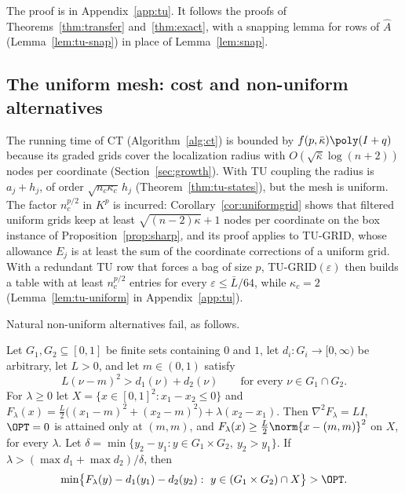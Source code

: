 The proof is in Appendix~\ref{app:tu}. It follows the proofs of
Theorems~\ref{thm:transfer} and~\ref{thm:exact}, with a snapping lemma for
rows of $\hat A$ (Lemma~\ref{lem:tu-snap}) in place of
Lemma~\ref{lem:snap}.

\subsection{The uniform mesh: cost and non-uniform alternatives}\label{sec:tu-limits}

The running time of CT (Algorithm~\ref{alg:ct}) is bounded by
$f(p,\bar\kappa)\poly(I+q)$ because its graded grids cover the localization
radius with $O(\sqrt{\bar\kappa}\log(n+2))$ nodes per coordinate
(Section~\ref{sec:growth}). With TU coupling the radius is
$a_j+h_j$, of order $\sqrt{n_c\kappa_c}\,h_j$ (Theorem~\ref{thm:tu-states}),
but the mesh is uniform. The factor $n_c^{p/2}$ in $K^p$ is incurred:
Corollary~\ref{cor:uniformgrid} shows that filtered uniform grids keep at
least $\sqrt{(n-2)\kappa}+1$ nodes per coordinate on the box instance of
Proposition~\ref{prop:sharp}, and its proof applies to TU-GRID, whose
allowance $E_j$ is at least the sum of the coordinate corrections of a
uniform grid. With a redundant TU row that forces a bag of size $p$,
TU-GRID$(\varepsilon)$ then builds a table with at least $n_c^{p/2}$ entries
for every $\varepsilon\le\bar L/64$, while $\kappa_c=2$
(Lemma~\ref{lem:tu-uniform} in Appendix~\ref{app:tu}).

Natural non-uniform alternatives fail, as follows.

\begin{proposition}\label{prop:tu-misaligned}
Let $G_1,G_2\subseteq[0,1]$ be finite sets containing $0$ and $1$, let
$d_i:G_i\to[0,\infty)$ be arbitrary, let $L>0$, and let $m\in(0,1)$ satisfy
\begin{equation}\label{eq:tu-gap}
L(\nu-m)^2>d_1(\nu)+d_2(\nu)\qquad\text{for every }\nu\in G_1\cap G_2 .
\end{equation}
For $\lambda\ge0$ let $X=\{x\in[0,1]^2:x_1-x_2\le0\}$ and
$F_\lambda(x)=\frac L2\bigl((x_1-m)^2+(x_2-m)^2\bigr)+\lambda(x_2-x_1)$. Then
$\nabla^2F_\lambda=LI$, $\OPT=0$ is attained only at $(m,m)$, and
$F_\lambda(x)\ge\frac L2\norm{x-(m,m)}^2$ on $X$, for every $\lambda$. Let
$\delta=\min\{y_2-y_1:y\in G_1\times G_2,\ y_2>y_1\}$. If
$\lambda>(\max d_1+\max d_2)/\delta$, then
\[
\min\bigl\{F_\lambda(y)-d_1(y_1)-d_2(y_2):\ y\in(G_1\times G_2)\cap X\bigr\}>\OPT .
\]
\end{proposition}

